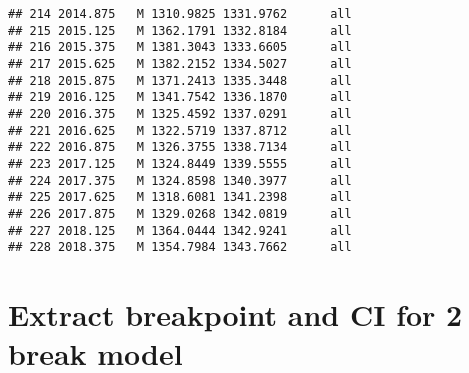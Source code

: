 \documentclass[]{article}
\newenvironment{Shaded}{\begin{snugshade}}{\end{snugshade}}
\newcommand{\DecValTok}[1]{\textcolor[rgb]{0.00,0.00,0.81}{#1}}
\newcommand{\FloatTok}[1]{\textcolor[rgb]{0.00,0.00,0.81}{#1}}
\newcommand{\StringTok}[1]{\textcolor[rgb]{0.31,0.60,0.02}{#1}}
\newcommand{\OperatorTok}[1]{\textcolor[rgb]{0.81,0.36,0.00}{\textbf{#1}}}
\newcommand{\NormalTok}[1]{#1}
\begin{document}
\begin{verbatim}
## 214 2014.875   M 1310.9825 1331.9762      all
## 215 2015.125   M 1362.1791 1332.8184      all
## 216 2015.375   M 1381.3043 1333.6605      all
## 217 2015.625   M 1382.2152 1334.5027      all
## 218 2015.875   M 1371.2413 1335.3448      all
## 219 2016.125   M 1341.7542 1336.1870      all
## 220 2016.375   M 1325.4592 1337.0291      all
## 221 2016.625   M 1322.5719 1337.8712      all
## 222 2016.875   M 1326.3755 1338.7134      all
## 223 2017.125   M 1324.8449 1339.5555      all
## 224 2017.375   M 1324.8598 1340.3977      all
## 225 2017.625   M 1318.6081 1341.2398      all
## 226 2017.875   M 1329.0268 1342.0819      all
## 227 2018.125   M 1364.0444 1342.9241      all
## 228 2018.375   M 1354.7984 1343.7662      all
\end{verbatim}

\section{Extract breakpoint and CI for 2 break
model}\label{extract-breakpoint-and-ci-for-2-break-model}

\begin{Shaded}
\end{Shaded}
\end{document}
